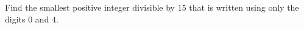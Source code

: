 Find the smallest positive integer divisible by $15$ that is written using only the digits $0$ and $4$.
